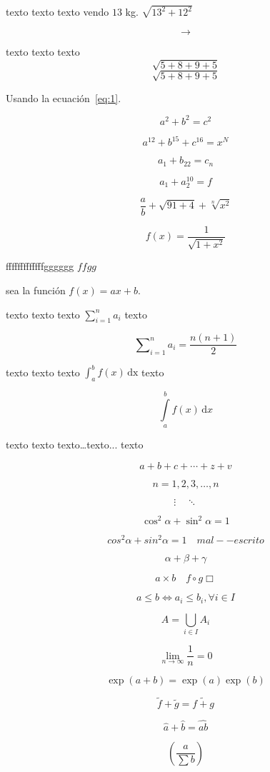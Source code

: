 \documentclass{report}
\renewcommand*{\fd}{\longrightarrow}
\begin{document}
\tableofcontents

texto texto texto vendo $13$ kg. $\sqrt{13^{2}+12^{2}}$

\[
\fd
\]

texto texto texto
\[
\sqrt{5+8+9+5}
\]
\begin{equation}\label{eq:1}
\sqrt{5+8+9+5}
\end{equation}

Usando la ecuación~\ref{eq:1}.

\[
a^{2}+b^{2}=c^{2}
\]

\[
a^{12}+b^{15}+c^{16}=x^{N}
\]

\[
a_{1}+b_{22}=c_{n}
\]

\[
a_{1}+a_{2}^{10}=f
\]

\[
\frac{a}{b}+\sqrt{91+4}+\sqrt[n]{x^{2}}
\]

\[
f(x)=\frac{1}{\sqrt{1+x^{2}}}
\]

fffffffffffffgggggg $ffgg$

sea la función $f(x)=ax+b$.

texto texto texto $\sum_{i=1}^{n} a_i$ texto

\[
\sum\nolimits_{i=1}^{n} a_i=\frac{n(n+1)}{2}
\]

texto texto texto $\int_{a}^{b}f(x)\,\mathrm{dx}$ texto

\[
\int\limits_{a}^{b}f(x)\,\mathrm{d}x
\]

texto texto texto\dots texto... texto

\[
a+b+c+\cdots+z+v
\]

\[
n=1,2,3,\ldots,n
\]

\[
\vdots\quad \ddots
\]

\[
\cos^{2}\alpha+\sin^{2}\alpha=1
\]


\[
cos^{2}\alpha+sin^{2}\alpha=1\quad mal--escrito
\]

\[
\alpha + \beta + \gamma
\]

\[
a\times b\quad f\circ g \Box%
\]

\[
a\leq b\Longleftrightarrow a_i\le b_i,\forall i\in I
\]

\[
A=\bigcup_{i\in I}A_i
\]

\newpage

\[
\lim\limits_{n\to\infty}\frac{1}{n}=0
\]

\[
\exp(a+b)=\exp(a)\exp(b)
\]

\[
\tilde{f}+\tilde{g}=\widetilde{f+g}
\]

\[
\hat{a}+\hat{b}=\widehat{ab}
\]

\[
\left(
\frac{a}{\sum b}
\right)
\]
\end{document}

